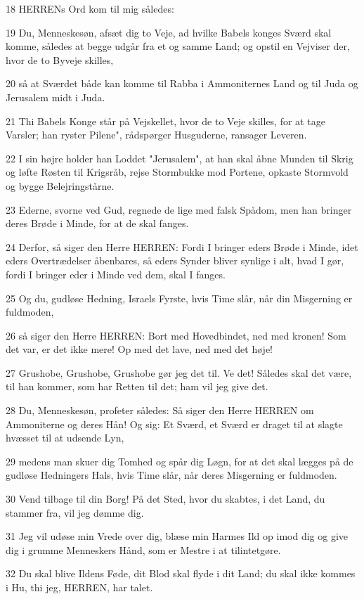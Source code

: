 \par 18 HERRENs Ord kom til mig således:
\par 19 Du, Menneskesøn, afsæt dig to Veje, ad hvilke Babels konges Sværd skal komme, således at begge udgår fra et og samme Land; og opstil en Vejviser der, hvor de to Byveje skilles,
\par 20 så at Sværdet både kan komme til Rabba i Ammoniternes Land og til Juda og Jerusalem midt i Juda.
\par 21 Thi Babels Konge står på Vejskellet, hvor de to Veje skilles, for at tage Varsler; han ryster Pilene", rådspørger Husguderne, ransager Leveren.
\par 22 I sin højre holder han Loddet "Jerusalem", at han skal åbne Munden til Skrig og løfte Røsten til Krigsråb, rejse Stormbukke mod Portene, opkaste Stormvold og bygge Belejringstårne.
\par 23 Ederne, svorne ved Gud, regnede de lige med falsk Spådom, men han bringer deres Brøde i Minde, for at de skal fanges.
\par 24 Derfor, så siger den Herre HERREN: Fordi I bringer eders Brøde i Minde, idet eders Overtrædelser åbenbares, så eders Synder bliver synlige i alt, hvad I gør, fordi I bringer eder i Minde ved dem, skal I fanges.
\par 25 Og du, gudløse Hedning, Israels Fyrste, hvis Time slår, når din Misgerning er fuldmoden,
\par 26 så siger den Herre HERREN: Bort med Hovedbindet, ned med kronen! Som det var, er det ikke mere! Op med det lave, ned med det høje!
\par 27 Grushobe, Grushobe, Grushobe gør jeg det til. Ve det! Således skal det være, til han kommer, som har Retten til det; ham vil jeg give det.
\par 28 Du, Menneskesøn, profeter således: Så siger den Herre HERREN om Ammoniterne og deres Hån! Og sig: Et Sværd, et Sværd er draget til at slagte hvæsset til at udsende Lyn,
\par 29 medens man skuer dig Tomhed og spår dig Løgn, for at det skal lægges på de gudløse Hedningers Hals, hvis Time slår, når deres Misgerning er fuldmoden.
\par 30 Vend tilbage til din Borg! På det Sted, hvor du skabtes, i det Land, du stammer fra, vil jeg dømme dig.
\par 31 Jeg vil udøse min Vrede over dig, blæse min Harmes Ild op imod dig og give dig i grumme Menneskers Hånd, som er Mestre i at tilintetgøre.
\par 32 Du skal blive Ildens Føde, dit Blod skal flyde i dit Land; du skal ikke kommes i Hu, thi jeg, HERREN, har talet.

